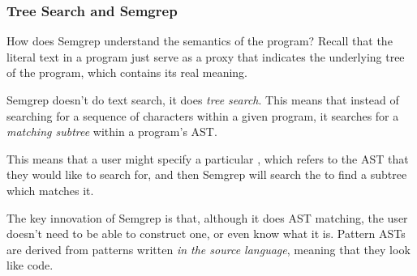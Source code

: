 \documentclass[aspectratio=169, handout]{beamer}
\begin{document}
\begin{frame}[fragile]
  \frametitle{Tree Search and Semgrep}

  How does Semgrep understand the semantics of the program? Recall that
  the literal text in a program just serve as a proxy that indicates the underlying
  tree of the program, which contains its real meaning.

  \pause
  \vspace{\fill}

  Semgrep doesn't do text search, it does \textit{tree search}. This means that
  instead of searching for a sequence of characters within a given program, it
  searches for a \textit{matching subtree} within a program's AST.

  \pause
  \vspace{\fill}

  This means that a user might specify a particular , which refers
  to the AST that they would like to search for, and then Semgrep will search the
   to find a subtree which matches it.

  \pause
  \vspace{\fill}

  The key innovation of Semgrep is that, although it does AST matching, the user
  doesn't need to be able to construct one, or even know what it is. Pattern ASTs
  are derived from patterns written \textit{in the source language}, meaning
  that they look like code.
\end{frame}
\end{document}
